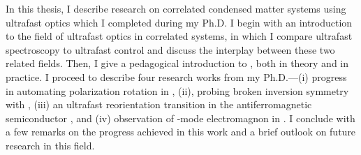 In this thesis, I describe research on correlated condensed matter systems using ultrafast optics which I completed during my Ph.D.
I begin with an introduction to the field of ultrafast optics in correlated systems, in which I compare ultrafast spectroscopy to ultrafast control and discuss the interplay between these two related fields.
Then, I give a pedagogical introduction to , both in theory and in practice.
I proceed to describe four research works from my Ph.D.---(i) progress in automating polarization rotation in , (ii), probing broken inversion symmetry with , (iii) an ultrafast reorientation transition in the antiferromagnetic semiconductor , and (iv) observation of \ahiggs-mode electromagnon in .
I conclude with a few remarks on the progress achieved in this work and a brief outlook on future research in this field.
